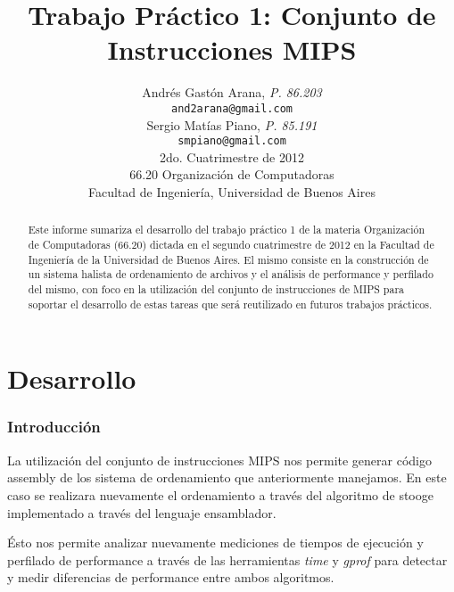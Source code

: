 \documentclass[a4paper,11pt]{article}
\title{\textbf{Trabajo Práctico 1: Conjunto de Instrucciones MIPS}}
\author{
  Andrés Gastón Arana, \textit{P. 86.203}                          \\
  \texttt{and2arana@gmail.com}                                     \\
  Sergio Matías Piano, \textit{P. 85.191}                          \\
  \texttt{smpiano@gmail.com}                                       \\ [2.5ex]
  \normalsize{2do. Cuatrimestre de 2012}                           \\
  \normalsize{66.20 Organización de Computadoras}                  \\
  \normalsize{Facultad de Ingeniería, Universidad de Buenos Aires}
}
\date{}
\begin{document}
\thispagestyle{empty}
\maketitle

\begin{abstract}

  Este informe sumariza el desarrollo del trabajo práctico 1 de la materia
  Organización de Computadoras (66.20) dictada en el segundo cuatrimestre de
  2012 en la Facultad de Ingeniería de la Universidad de Buenos Aires.
  El mismo consiste en la construcción de un sistema halista de ordenamiento de
  archivos y el análisis de performance y perfilado del mismo, con foco en la
  utilización del conjunto de instrucciones de MIPS para soportar el
  desarrollo de estas tareas que será reutilizado en futuros trabajos
  prácticos.

\end{abstract}

\clearpage

\tableofcontents
\clearpage


\part{Desarrollo}

\section{Introducción}

La utilización del conjunto de instrucciones MIPS nos permite generar código
assembly de los sistema de ordenamiento que anteriormente manejamos.
En este caso se realizara nuevamente el ordenamiento a través del algoritmo 
de stooge implementado a través del lenguaje ensamblador.

Ésto nos permite analizar nuevamente mediciones de tiempos de
ejecución y perfilado de performance a través de las herramientas \textit{time}
\cite{WIKITIME} y \textit{gprof} \cite{GPROF} para detectar y medir diferencias
de performance entre ambos algoritmos.
\end{document}
